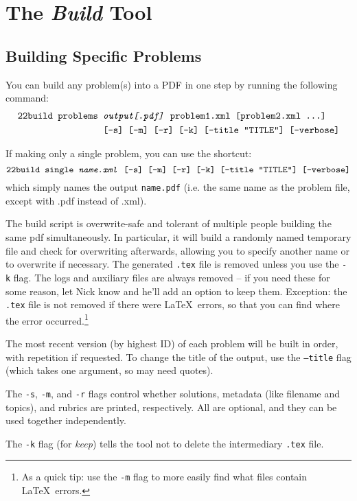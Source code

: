 \section{The \textit{Build} Tool}
  \subsection{Building Specific Problems}
    You can build any problem(s) into a PDF in one step by running the 
    following command:
    \begin{align*}\texttt{22build }\texttt{problems }&\texttt{\textit{output[.pdf]} problem1.xml [problem2.xml \dots]}\\
        ~&\texttt{[-s] [-m] [-r] [-k] [--title ``TITLE''] [--verbose]}\end{align*}
        
    If making only a single problem, you can use the shortcut:
    \[\texttt{22build }\texttt{single \textit{name.xml} 
        [-s] [-m] [-r] [-k] [--title ``TITLE''] [--verbose]}\]
    which simply names the output \texttt{name.pdf} (i.e. the same name as 
    the problem file, except with .pdf instead of .xml).
    
    The build script is overwrite-safe and tolerant of multiple people 
    building the same pdf simultaneously. In particular, it will build a 
    randomly named temporary file and check for overwriting afterwards, 
    allowing you to specify another name or to overwrite if necessary. The 
    generated \texttt{.tex} file is removed unless you use the \texttt{-k} 
    flag. The logs and auxiliary files are always removed -- if you need 
    these for some reason, let Nick know and he'll 
    add an option to keep them. Exception: the \texttt{.tex} file is not 
    removed if there were \LaTeX\ errors, so that you can find where the 
    error occurred.\footnote{As a quick tip: use the \texttt{-m} flag to 
    more easily find what files contain \LaTeX\ errors.}
    
    The most recent version (by highest ID) of each problem will be built 
    in order, with repetition if requested. To change the 
    title of the output, use the \texttt{--title} flag (which takes one 
    argument, so may need quotes).
    
    The \texttt{-s}, \texttt{-m}, and \texttt{-r} flags control whether 
    solutions, metadata (like filename and topics), and rubrics are 
    printed, respectively. All are optional, and they can be used together 
    independently.
    
    The \texttt{-k} flag (for \textit{keep}) tells the tool not to delete the
    intermediary \texttt{.tex} file.
    
